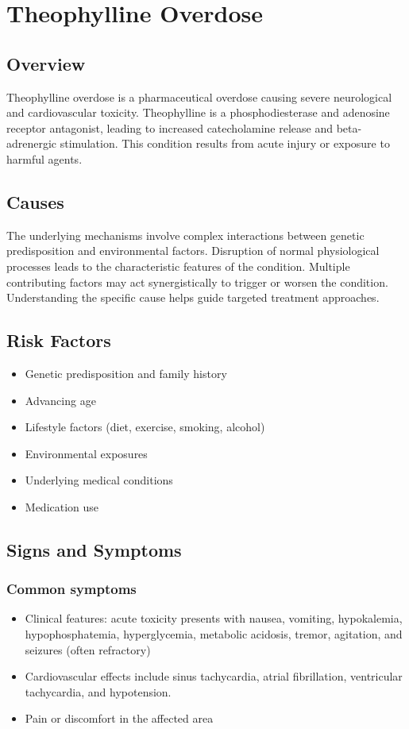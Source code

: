 \chapter{Theophylline Overdose}
\label{sec:Theophylline Overdose}

\section{Overview}
Theophylline overdose is a pharmaceutical overdose causing severe neurological and cardiovascular toxicity. Theophylline is a phosphodiesterase and adenosine receptor antagonist, leading to increased catecholamine release and beta-adrenergic stimulation. This condition results from acute injury or exposure to harmful agents.
\section{Causes}
The underlying mechanisms involve complex interactions between genetic predisposition and environmental factors. Disruption of normal physiological processes leads to the characteristic features of the condition. Multiple contributing factors may act synergistically to trigger or worsen the condition. Understanding the specific cause helps guide targeted treatment approaches.
\section{Risk Factors}


\begin{itemize}[noitemsep]
  \item Genetic predisposition and family history
  \item Advancing age
  \item Lifestyle factors (diet, exercise, smoking, alcohol)
  \item Environmental exposures
  \item Underlying medical conditions
  \item Medication use
\end{itemize}
\section{Signs and Symptoms}

\subsection{Common symptoms}
\begin{itemize}[noitemsep]
  \item Clinical features: acute toxicity presents with nausea, vomiting, hypokalemia, hypophosphatemia, hyperglycemia, metabolic acidosis, tremor, agitation, and seizures (often refractory)
  \item Cardiovascular effects include sinus tachycardia, atrial fibrillation, ventricular tachycardia, and hypotension.
  \item Pain or discomfort in the affected area
  \end{itemize}

